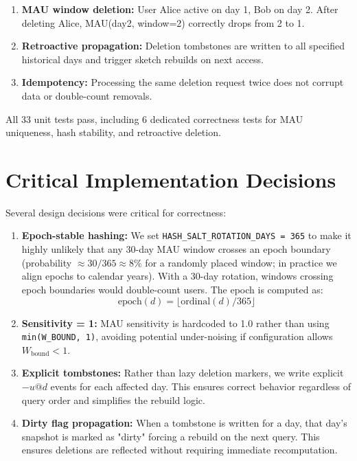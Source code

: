 \documentclass[11pt]{article}
\begin{document}
\begin{appendices}
\begin{enumerate}[leftmargin=*]
    \item \textbf{MAU window deletion:} User Alice active on day 1, Bob on day 2. After deleting Alice, MAU(day2, window=2) correctly drops from 2 to 1.
    
    \item \textbf{Retroactive propagation:} Deletion tombstones are written to all specified historical days and trigger sketch rebuilds on next access.
    
    \item \textbf{Idempotency:} Processing the same deletion request twice does not corrupt data or double-count removals.
\end{enumerate}

All 33 unit tests pass, including 6 dedicated correctness tests for MAU uniqueness, hash stability, and retroactive deletion.

\section{Critical Implementation Decisions}
\label{appendix:decisions}

Several design decisions were critical for correctness:

\begin{enumerate}[leftmargin=*]
    \item \textbf{Epoch-stable hashing:} We set \texttt{HASH\_SALT\_ROTATION\_DAYS = 365} to make it highly unlikely that any 30-day MAU window crosses an epoch boundary (probability $\approx 30/365 \approx 8\%$ for a randomly placed window; in practice we align epochs to calendar years). With a 30-day rotation, windows crossing epoch boundaries would double-count users. The epoch is computed as:
    \[
    \text{epoch}(d) = \lfloor \text{ordinal}(d) / 365 \rfloor
    \]
    
    \item \textbf{Sensitivity = 1:} MAU sensitivity is hardcoded to 1.0 rather than using \texttt{min(W\_BOUND, 1)}, avoiding potential under-noising if configuration allows $W_{\text{bound}} < 1$.
    
    \item \textbf{Explicit tombstones:} Rather than lazy deletion markers, we write explicit $-u@d$ events for each affected day. This ensures correct behavior regardless of query order and simplifies the rebuild logic.
    
    \item \textbf{Dirty flag propagation:} When a tombstone is written for a day, that day's snapshot is marked as "dirty" forcing a rebuild on the next query. This ensures deletions are reflected without requiring immediate recomputation.
\end{enumerate}


\end{appendices}
\end{document}
